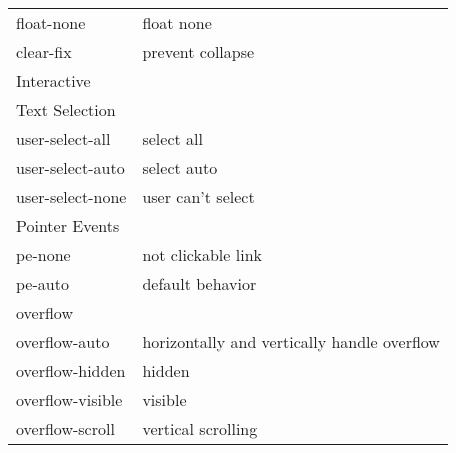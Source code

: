 \documentclass{article}
\begin{document}
\begin{longtable}{ll}
			float-none                                  & float none                                                                      \\
			clear-fix                                   & prevent collapse                                                                \\ \hline
			Interactive                                 &                                                                                 \\ \hline
			Text Selection                              &                                                                                 \\ \hline
			user-select-all                             & select all                                                                      \\
			user-select-auto                            & select auto                                                                     \\
			user-select-none                            & user can't select                                                               \\ \hline
			Pointer Events                              &                                                                                 \\ \hline
			pe-none                                     & not clickable link                                                              \\
			pe-auto                                     & default behavior                                                                \\ \hline
			overflow                                    &                                                                                 \\ \hline
			overflow-auto                               & horizontally and vertically handle overflow                                     \\
			overflow-hidden                             & hidden                                                                          \\
			overflow-visible                            & visible                                                                         \\
			overflow-scroll                             & vertical scrolling                                                              \\ \hline

\end{longtable}
\end{document}
